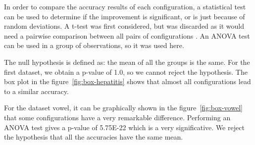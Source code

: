 \documentclass[a4paper]{article}
\begin{document}
In order to compare the accuracy results of each configuration, a statistical 
test can be used to determine if the improvement is significant, or is just 
because of random deviations. A t-test was first considered, but was discarded 
as it would need a pairwise comparison between all pairs of configurations 
\cite{janez}.  An ANOVA test can be used in a group of observations, so it was 
used here.

The null hypothesis is defined as: the mean of all the groups is the same. For 
the first dataset, we obtain a p-value of 1.0, so we cannot reject the 
hypothesis. The box plot in the figure~\ref{fig:box-hepatitis} shows that almost 
all configurations lead to a similar accuracy.

For the dataset vowel, it can be graphically shown in the 
figure~\ref{fig:box-vowel} that some configurations have a very remarkable 
difference. Performing an ANOVA test gives a p-value of \num{5.75E-22} which is 
a very significative. We reject the hypothesis that all the accuracies have the 
same mean.
\end{document}
